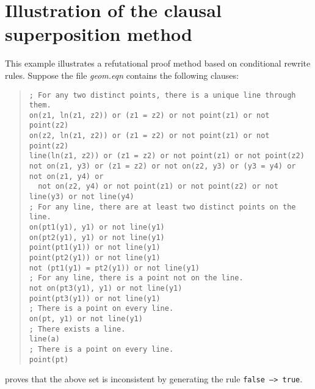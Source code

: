 \chapter{Illustration of the clausal superposition method}
\normalsize
\rm
This example illustrates a refutational proof method based on
conditional rewrite rules. Suppose the file {\em geom.eqn} contains 
the following clauses:
\begin{quote}
\small
\begin{verbatim}
; For any two distinct points, there is a unique line through them.
on(z1, ln(z1, z2)) or (z1 = z2) or not point(z1) or not point(z2)
on(z2, ln(z1, z2)) or (z1 = z2) or not point(z1) or not point(z2)
line(ln(z1, z2)) or (z1 = z2) or not point(z1) or not point(z2)
not on(z1, y3) or (z1 = z2) or not on(z2, y3) or (y3 = y4) or not on(z1, y4) or  
  not on(z2, y4) or not point(z1) or not point(z2) or not line(y3) or not line(y4)
; For any line, there are at least two distinct points on the line.
on(pt1(y1), y1) or not line(y1) 
on(pt2(y1), y1) or not line(y1) 
point(pt1(y1)) or not line(y1) 
point(pt2(y1)) or not line(y1) 
not (pt1(y1) = pt2(y1)) or not line(y1)
; For any line, there is a point not on the line.
not on(pt3(y1), y1) or not line(y1)
point(pt3(y1)) or not line(y1) 
; There is a point on every line.
on(pt, y1) or not line(y1)
; There exists a line.
line(a)
; There is a point on every line.
point(pt)       
\end{verbatim}
\end{quote}
\RRL proves that the above set is inconsistent by generating the rule
{\tt false ---> true}.
\scriptsize
\tt
